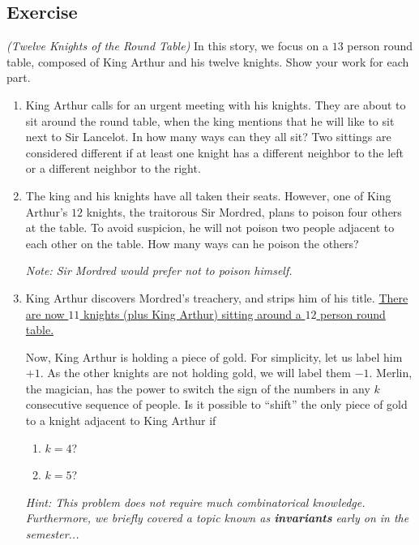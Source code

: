 \documentclass{article}
\newcounter{counter}
\newcommand{\Exercise}{Exercise \stepcounter{counter}\thecounter}
\begin{document}
\subsection*{\Exercise}
    \textit{(Twelve Knights of the Round Table)} In this story, we focus on a $13$ person round table, composed of King Arthur and his twelve knights. Show your work for each part.
    \begin{enumerate}
        \item King Arthur calls for an urgent meeting with his knights. They are about to sit around the round table, when the king mentions that he will like to sit next to Sir Lancelot. In how many ways can they all sit? Two sittings are considered different if at least one knight has a different neighbor to the left or a different neighbor to the right.
        \item The king and his knights have all taken their seats. However, one of King Arthur's $12$ knights, the traitorous Sir Mordred, plans to poison four others at the table. To avoid suspicion, he will not poison two people adjacent to each other on the table. How many ways can he poison the others?
        
        \vspace{1mm}\textit{Note: Sir Mordred would prefer not to poison himself.}
        \item King Arthur discovers Mordred's treachery, and strips him of his title. \ul{There are now $11$ knights (plus King Arthur) sitting around a $12$ person round table.}
        
        \vspace{1.5mm} \qquad Now, King Arthur is holding a piece of gold. For simplicity, let us label him $+1$. As the other knights are not holding gold, we will label them $-1$. Merlin, the magician, has the power to switch the sign of the numbers in any $k$ consecutive sequence of people. Is it possible to ``shift'' the only piece of gold to a knight adjacent to King Arthur if 
        \begin{enumerate}[label = \roman*.]
            \item $k = 4$?
            \item $k = 5$?
        \end{enumerate}
        
        \vspace{1mm}\textit{Hint: This problem does not require much combinatorical knowledge. Furthermore, we briefly covered a topic known as \textbf{invariants} early on in the semester...}
    \end{enumerate}
\end{document}
